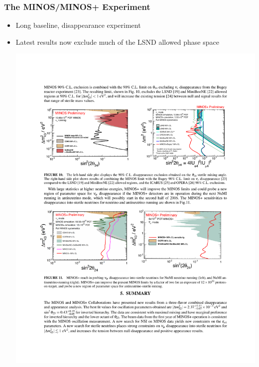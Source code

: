 \documentclass[mathserif,18pt,xcolor=table]{beamer}
\begin{document}
\begin{frame}
  \frametitle{The MINOS/MINOS+ Experiment}
  \begin{itemize}
  \item Long baseline, disappearance experiment
  \item Latest results now exclude much of the LSND allowed phase space
    \begin{center}
      \includegraphics[width=.9\linewidth]{../figures/minos2.pdf}
    \end{center}
  \end{itemize}
\end{frame}
\end{document}
